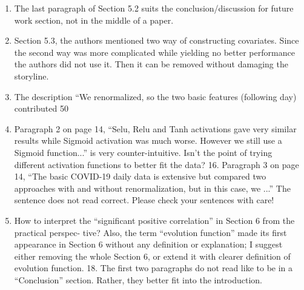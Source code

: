 \begin{enumerate}
    \begin{quote}
    \end{quote}

\item \DOIT The last paragraph of Section 5.2 suits the conclusion/discussion for future work section, not in the middle of a paper.

    \begin{quote}
    \end{quote}

\item \DOIT Section 5.3, the authors mentioned two way of constructing covariates. Since the second way was more complicated while yielding no better performance the authors did not use it. Then it can be removed without damaging the storyline.

    \begin{quote}
    \end{quote}

\item \DOIT The description “We renormalized, so the two basic features (following day) contributed 50%

    \begin{quote}
    \end{quote}

\item \DOIT Paragraph 2 on page 14, “Selu, Relu and Tanh activations gave very similar results while Sigmoid activation was much worse. However we still use a Sigmoid function...” is very counter-intuitive. Isn’t the point of trying different activation functions to better fit the data?
16. Paragraph 3 on page 14, “The basic COVID-19 daily data is extensive but compared two approaches with and without renormalization, but in this case, we ...” The sentence does not read correct. Please check your sentences with care!

    \begin{quote}
    \end{quote}

\item \DOIT How to interpret the “significant positive correlation” in Section 6 from the practical perspec- tive? Also, the term “evolution function” made its first appearance in Section 6 without any definition or explanation; I suggest either removing the whole Section 6, or extend it with clearer definition of evolution function.
18. The first two paragraphs do not read like to be in a “Conclusion” section. Rather, they better fit into the introduction.
    
    \begin{quote}
    \end{quote}

\end{enumerate}

\clearpage
